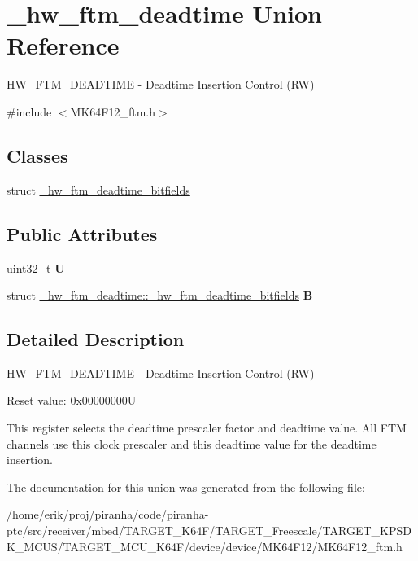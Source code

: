 \hypertarget{union__hw__ftm__deadtime}{}\section{\+\_\+hw\+\_\+ftm\+\_\+deadtime Union Reference}
\label{union__hw__ftm__deadtime}


H\+W\+\_\+\+F\+T\+M\+\_\+\+D\+E\+A\+D\+T\+I\+ME -\/ Deadtime Insertion Control (RW)  




{\ttfamily \#include $<$M\+K64\+F12\+\_\+ftm.\+h$>$}

\subsection*{Classes}
\begin{DoxyCompactItemize}
\item 
struct \hyperlink{struct__hw__ftm__deadtime_1_1__hw__ftm__deadtime__bitfields}{\+\_\+hw\+\_\+ftm\+\_\+deadtime\+\_\+bitfields}
\end{DoxyCompactItemize}
\subsection*{Public Attributes}
\begin{DoxyCompactItemize}
\item 
uint32\+\_\+t {\bfseries U}\hypertarget{union__hw__ftm__deadtime_abdb409daac3d0f008835c6bc19567c4a}{}\label{union__hw__ftm__deadtime_abdb409daac3d0f008835c6bc19567c4a}

\item 
struct \hyperlink{struct__hw__ftm__deadtime_1_1__hw__ftm__deadtime__bitfields}{\+\_\+hw\+\_\+ftm\+\_\+deadtime\+::\+\_\+hw\+\_\+ftm\+\_\+deadtime\+\_\+bitfields} {\bfseries B}\hypertarget{union__hw__ftm__deadtime_a99915c0ecd2454479d0f764dce76c49b}{}\label{union__hw__ftm__deadtime_a99915c0ecd2454479d0f764dce76c49b}

\end{DoxyCompactItemize}


\subsection{Detailed Description}
H\+W\+\_\+\+F\+T\+M\+\_\+\+D\+E\+A\+D\+T\+I\+ME -\/ Deadtime Insertion Control (RW) 

Reset value\+: 0x00000000U

This register selects the deadtime prescaler factor and deadtime value. All F\+TM channels use this clock prescaler and this deadtime value for the deadtime insertion. 

The documentation for this union was generated from the following file\+:\begin{DoxyCompactItemize}
\item 
/home/erik/proj/piranha/code/piranha-\/ptc/src/receiver/mbed/\+T\+A\+R\+G\+E\+T\+\_\+\+K64\+F/\+T\+A\+R\+G\+E\+T\+\_\+\+Freescale/\+T\+A\+R\+G\+E\+T\+\_\+\+K\+P\+S\+D\+K\+\_\+\+M\+C\+U\+S/\+T\+A\+R\+G\+E\+T\+\_\+\+M\+C\+U\+\_\+\+K64\+F/device/device/\+M\+K64\+F12/M\+K64\+F12\+\_\+ftm.\+h\end{DoxyCompactItemize}
